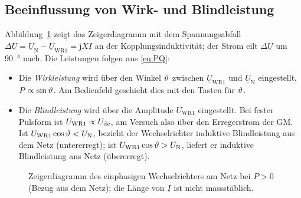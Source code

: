 \subsection{Beeinflussung von Wirk- und Blindleistung}

Abbildung~\ref{fig:zeiger} zeigt das Zeigerdiagramm mit dem Spannungsabfall $\Delta\underline U=\underline U_{\mathrm N}-\underline U_{\mathrm{WR1}}=\mathrm{j}X\underline I$ an der Kopplungsinduktivität; der Strom eilt $\Delta\underline U$ um \SI{90}{\degree} nach. Die Leistungen folgen aus \eqref{eq:PQ}:

\begin{itemize}
  \item Die \emph{Wirkleistung} wird über den Winkel $\vartheta$ zwischen $\underline U_{\mathrm{WR1}}$ und $\underline U_{\mathrm N}$ eingestellt, $P\propto\sin\vartheta$. Am Bedienfeld geschieht dies mit den Tasten für $\vartheta$.
  \item Die \emph{Blindleistung} wird über die Amplitude $U_{\mathrm{WR1}}$ eingestellt. Bei fester Pulsform ist $U_{\mathrm{WR1}}\propto U_{\mathrm{dc}}$, am Versuch also über den Erregerstrom der GM. Ist $U_{\mathrm{WR1}}\cos\vartheta<U_{\mathrm{N}}$, bezieht der Wechselrichter induktive Blindleistung aus dem Netz (untererregt); ist $U_{\mathrm{WR1}}\cos\vartheta>U_{\mathrm{N}}$, liefert er induktive Blindleistung ans Netz (übererregt).
\end{itemize}

\begin{figure}[htbp]
  \centering
  \caption{Zeigerdiagramm des einphasigen Wechselrichters am Netz bei $P>0$ (Bezug aus dem Netz); die Länge von $\underline I$ ist nicht massstäblich.}
  \label{fig:zeiger}
\end{figure}
